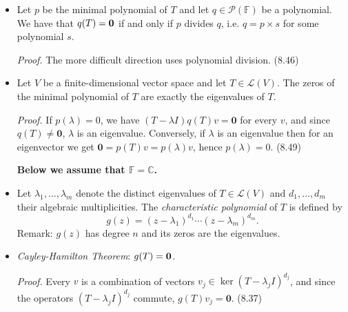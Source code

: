 \documentclass[11pt]{article}
\newcommand{\1}{\mathbf{1}}
\newcommand{\0}{\mathbf{0}}
\newcommand{\C}{\mathbb{C}}
\newcommand{\F}{\mathbb{F}}
\newcommand{\cL}{\mathcal{L}}
\newcommand{\cP}{\mathcal{P}}
\begin{document}
{\begin{itemize}
There exists a unique monic polynomial $p \in \cP(\F)$ of smallest degree such that $p(T)={\bf 0}$. The polynomial $p$ is called the {\it minimal polynomial} of $T$.

\emph{Proof.}
Consider the largest $m$ such that $I,T,T^2,\dots,T^m$ is linearly independent (such $m$ exists since $\cL(V)$ is finite-dimensional).
Then $I,T,T^2,\dots,T^m$ is a basis for its span, which in turn contains $T^{m+1}$ by definition of $m$.
Therefore, there is a unique monic polynomial $p(z) = z^{m+1} + a_{m} z^{m} + \dots + a_1 z + a_0$ of degree $m+1$ such that $p(T) = \0$.
Moreover, if $q$ is a polynomial of smaller degree such that $q(T)=\0$, by linear independence of $I,T,T^2,\dots,T^m$ we have $q=\0$, so $q$ cannot be monic.
\hfill
(8.40)

\item

Let $p$ be the minimal polynomial of $T$ and let $q\in\mathcal{P}(\mathbb{F})$ be a polynomial. We have that $q(T)={\bf 0}$ if and only if $p$ divides $q$, i.e. $q=p\times s$ for some polynomial $s$.

\emph{Proof.}
The more difficult direction uses polynomial division.
\hfill
(8.46)

\item

Let $V$ be a finite-dimensional vector space and let $T\in\mathcal{L}(V)$. The zeros of the minimal polynomial of $T$ are exactly the eigenvalues of $T$.

\emph{Proof.}
If $p(\lambda)=0$, we have $(T-\lambda I)q(T) v = \0$ for every $v$, and since $q(T) \ne \0$, $\lambda$ is an eigenvalue.
Conversely, if $\lambda$ is an eigenvalue then for an eigenvector we get $\0 = p(T)v = p(\lambda) v$, hence $p(\lambda)=0$.
\hfill
(8.49)

\bigskip
\hfil
\textbf{Below we assume that $\F=\C$.}
\medskip

\item

Let $\lambda_1,\dots,\lambda_m$ denote the distinct eigenvalues of $T\in\mathcal{L}(V)$ and $d_1,\dots,d_m$ their algebraic multiplicities.
The \emph{characteristic polynomial} of $T$ is defined by
\[
g(z) = (z-\lambda_1)^{d_1} \cdots (z-\lambda_m)^{d_m}.
\]
Remark: $g(z)$ has degree $n$ and its zeros are the eigenvalues.

\item

\emph{Cayley-Hamilton Theorem}: $g(T)={\bf 0}$.

\emph{Proof.} Every $v$ is a combination of vectors $v_j \in \ker (T-\lambda_j I)^{d_j}$, and since the operators $(T-\lambda_j I)^{d_j}$ commute, $g(T) v_j = \0$.
\hfill
(8.37)


\end{itemize}}
\end{document}
